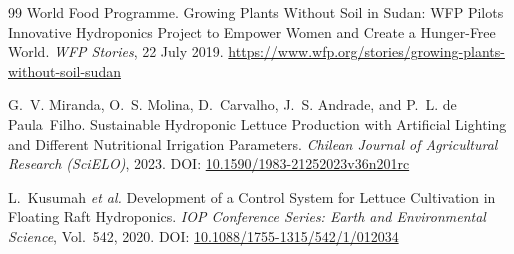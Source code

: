 \documentclass[12pt,a4paper]{article}
\begin{document}
\begin{thebibliography}{99}
World Food Programme. Growing Plants Without Soil in Sudan: WFP Pilots Innovative Hydroponics Project to Empower Women and Create a Hunger-Free World. \textit{WFP Stories}, 22 July 2019.
\url{https://www.wfp.org/stories/growing-plants-without-soil-sudan}

G.~V. Miranda, O.~S. Molina, D.~Carvalho, J.~S. Andrade, and P.~L. de Paula~Filho. Sustainable Hydroponic Lettuce Production with Artificial Lighting and Different Nutritional Irrigation Parameters. \textit{Chilean Journal of Agricultural Research (SciELO)}, 2023.
DOI: \href{https://doi.org/10.1590/1983-21252023v36n201rc}{10.1590/1983-21252023v36n201rc}

L.~Kusumah \emph{et al.} Development of a Control System for Lettuce Cultivation in Floating Raft Hydroponics. \textit{IOP Conference Series: Earth and Environmental Science}, Vol.~542, 2020.
DOI: \href{https://doi.org/10.1088/1755-1315/542/1/012034}{10.1088/1755-1315/542/1/012034}

\end{thebibliography}
\end{document}
